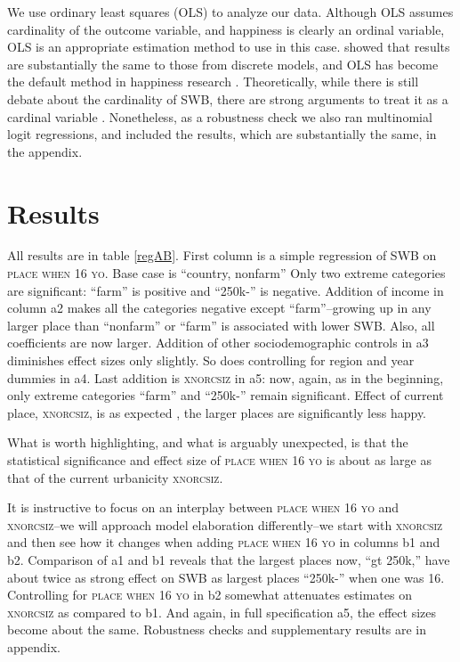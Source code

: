\documentclass[10pt, letterpaper]{article}
\begin{document}
\begin{spacing}{2.0}
We use ordinary least squares (OLS) to analyze our data. Although OLS assumes cardinality of the
outcome variable, and happiness is clearly an ordinal variable, OLS is an appropriate estimation method to use in this case.
\citet{carbonell04} showed that results are substantially the same to those from discrete models, and  OLS has become the default method in happiness research \citep{blanchflower11}. Theoretically, while there is still debate about the cardinality of SWB, there are strong arguments to treat it as a cardinal variable \citep{ng96,ng97,ng11}. Nonetheless, as a robustness check we also ran multinomial logit regressions, and included the results, which are substantially the same, in the appendix.


\section*{Results}



All  results are in table \ref{regAB}. 
%
First column is a simple regression of SWB on \textsc{place when 16 yo}. Base
case is ``country, nonfarm'' Only two extreme categories are significant: ``farm'' is
positive and ``250k-'' is negative. Addition of income in column a2 
makes all the categories negative except ``farm''--growing up in any larger place
than ``nonfarm'' or ``farm'' is associated with lower SWB. Also, all
coefficients are now larger. Addition of other sociodemographic controls in a3
diminishes effect sizes only slightly. So does controlling for region and year
dummies in a4. Last addition is \textsc{xnorcsiz} in a5: now, again, as in the
beginning, only extreme categories  ``farm'' and  ``250k-'' remain
significant. Effect of current place, \textsc{xnorcsiz}, is as expected \citep{aok-ls_fisher16}, the larger places are significantly less happy.

What is worth highlighting, and what is arguably unexpected, is that the statistical significance  and effect size
 of \textsc{place when 16 yo} is about as large as that of the current urbanicity \textsc{xnorcsiz}.

It is instructive to focus on an interplay between
\textsc{place when 16 yo} and \textsc{xnorcsiz}--we will approach model elaboration differently--we start with
\textsc{xnorcsiz} and then see how it changes when adding \textsc{place when 16
  yo} in columns  b1 and b2. Comparison of a1
and b1 reveals that the largest places now, ``gt 250k,'' have about twice as
strong effect on SWB as largest places ``250k-'' when one was 16. 
%
Controlling for \textsc{place when 16 yo} in b2 somewhat attenuates estimates on \textsc{xnorcsiz} as compared to b1. 
%
And again, in full specification a5, the effect
sizes become about the same.
 Robustness checks and supplementary results are in appendix.



\end{spacing}
\end{document}
